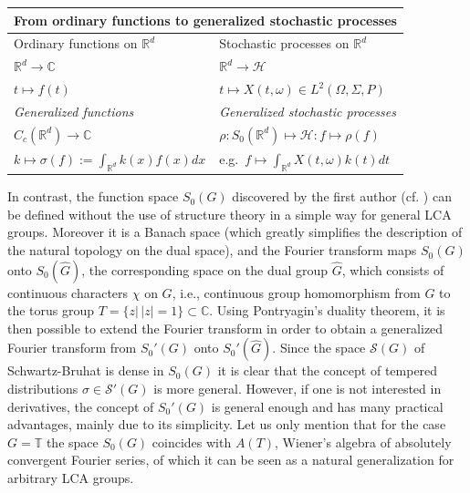 \documentclass[graybox]{svmult}
\begin{document}
\begin{table}
{\begin{tabular*}{237pt}{l|l@{\ }}
\hline
\multicolumn{2}{l}{From ordinary functions to generalized stochastic processes} \\
\hline
Ordinary functions on $\mathbb{R}^d$  & Stochastic processes on $\mathbb{R}^d$ \\
\hline
$\mathbb{R}^d \to \mathbb{C} $  &
$\mathbb{R}^d \to {\mathcal{H}}  $ \\
\hline
$t \mapsto f(t)$ & $t \mapsto X(t,\omega) \in  {L^2(\varOmega,\varSigma,P)} $ \\
\hline
\textit{Generalized functions}  & \textit{Generalized stochastic processes} \\
\hline
${ C_c(\mathbb{R}^d)} \to \mathbb{C} $ & $\rho: { S_0(\mathbb{R}^d)} \mapsto {\mathcal{H}}: f \mapsto \rho(f)$   \\
\hline
$k \mapsto  \sigma(f):= \int_{\mathbb{R}^d} k(x) f(x) dx $  & e.g.\ $ f \mapsto \int_{\mathbb{R}^d} X(t,\omega) k(t) dt $\\
\hline
\end{tabular*}}
{}
\end{table}

In contrast, the function space ${S_{0}(G)}$ discovered by the
first author (cf.
\cite{fe81-2,re89}) can be defined without the use of structure
theory in a simple
way for general LCA groups. Moreover it is a Banach space (which greatly
simplifies the description of the natural topology on the dual space), and
the Fourier transform maps ${S_{0}(G)}$ onto $S_{0}(\hat{G})$, the
corresponding space on the dual group $\hat{G}$, which consists
 of continuous characters $\chi$ on $G$, i.e.,  continuous
 group homomorphism from $G$ to the torus group $T = \{ z | \, |z| = 1\}
 \subset \mathbb{C}$.  Using Pontryagin's
duality theorem, it is then possible to extend the Fourier transform in order
to obtain a generalized Fourier transform from
${S_0{ '}(G)}$ onto $S_{0}'(\hat{G})$. Since the
space $\mathcal{S}(G)$ of Schwartz-Bruhat is dense in ${S_{0}(G)}$
it is clear that the
concept of tempered distributions $\sigma \in \mathcal{S}'(G)$ is more
general. However, if one is not
interested in derivatives, the concept of ${S_0{ '}(G)}$ is general enough
and has many
practical advantages, mainly due to its simplicity. Let us only mention that
for the case $G= \mathbb{T}$ the space ${S_{0}(G)}$ coincides with $A(T)$,
Wiener's algebra of absolutely convergent Fourier series,
of which it can be seen as a natural generalization for arbitrary LCA groups.
\end{document}
